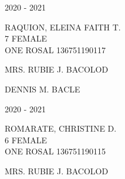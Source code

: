\documentclass{article}
\begin{document}
{{\newpage
\begin{multicols}{2}
\phantom{u}
\columnbreak
\vspace*{-3mm}
\begin{center}
\phantom{school year:} \hspace*{6em} 2020 - 2021 
\end{center} 
\vspace{4mm} 
\phantom{Name:} \hspace*{5em} RAQUION, ELEINA FAITH T. \\[2.5mm] %
\phantom{Age} \hspace*{8em} 7  \phantom{Sex} \hspace*{12em} FEMALE \\[2.5mm] %
\phantom{Grade} \hspace*{3em} ONE \phantom{Section} \hspace*{4em} ROSAL \phantom{LRN} \hspace*{4em} 136751190117 \\
\vspace*{25mm}
\begin{flushright}
MRS. RUBIE J. BACOLOD \hspace*{-1.5em}
\end{flushright}  
\vspace*{1.5mm}
\hspace*{3em} DENNIS M. BACLE
\end{multicols} 
\newpage
\begin{multicols}{2}
\phantom{u}
\columnbreak
\vspace*{-3mm}
\begin{center}
\phantom{school year:} \hspace*{6em} 2020 - 2021 
\end{center} 
\vspace{4mm} 
\phantom{Name:} \hspace*{5em} ROMARATE, CHRISTINE D. \\[2.5mm] %
\phantom{Age} \hspace*{8em} 6  \phantom{Sex} \hspace*{12em} FEMALE \\[2.5mm] %
\phantom{Grade} \hspace*{3em} ONE \phantom{Section} \hspace*{4em} ROSAL \phantom{LRN} \hspace*{4em} 136751190115 \\
\vspace*{25mm}
\begin{flushright}
MRS. RUBIE J. BACOLOD \hspace*{-1.5em}

\end{flushright}
\end{multicols}}}
\end{document}
